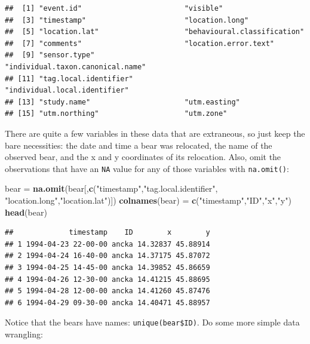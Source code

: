 \documentclass[]{book}
\newenvironment{Shaded}{\begin{snugshade}}{\end{snugshade}}
\newcommand{\KeywordTok}[1]{\textcolor[rgb]{0.13,0.29,0.53}{\textbf{#1}}}
\newcommand{\StringTok}[1]{\textcolor[rgb]{0.31,0.60,0.02}{#1}}
\newcommand{\CommentTok}[1]{\textcolor[rgb]{0.56,0.35,0.01}{\textit{#1}}}
\newcommand{\OperatorTok}[1]{\textcolor[rgb]{0.81,0.36,0.00}{\textbf{#1}}}
\newcommand{\NormalTok}[1]{#1}
\theoremstyle{definition}
\theoremstyle{definition}
\theoremstyle{definition}
\theoremstyle{remark}
\begin{document}
\begin{verbatim}
##  [1] "event.id"                        "visible"                        
##  [3] "timestamp"                       "location.long"                  
##  [5] "location.lat"                    "behavioural.classification"     
##  [7] "comments"                        "location.error.text"            
##  [9] "sensor.type"                     "individual.taxon.canonical.name"
## [11] "tag.local.identifier"            "individual.local.identifier"    
## [13] "study.name"                      "utm.easting"                    
## [15] "utm.northing"                    "utm.zone"
\end{verbatim}

There are quite a few variables in these data that are extraneous, so
just keep the bare necessities: the date and time a bear was relocated,
the name of the observed bear, and the x and y coordinates of its
relocation. Also, omit the observations that have an \texttt{NA} value
for any of those variables with \texttt{na.omit()}:

\begin{Shaded}
\begin{Highlighting}[]
\NormalTok{bear =}\StringTok{ }\KeywordTok{na.omit}\NormalTok{(bear[,}\KeywordTok{c}\NormalTok{(}\StringTok{"timestamp"}\NormalTok{,}\StringTok{"tag.local.identifier"}\NormalTok{,}
                        \StringTok{"location.long"}\NormalTok{,}\StringTok{"location.lat"}\NormalTok{)])}
\KeywordTok{colnames}\NormalTok{(bear) =}\StringTok{ }\KeywordTok{c}\NormalTok{(}\StringTok{"timestamp"}\NormalTok{,}\StringTok{"ID"}\NormalTok{,}\StringTok{"x"}\NormalTok{,}\StringTok{"y"}\NormalTok{)}
\KeywordTok{head}\NormalTok{(bear)}
\end{Highlighting}
\end{Shaded}

\begin{verbatim}
##             timestamp    ID        x        y
## 1 1994-04-23 22-00-00 ancka 14.32837 45.88914
## 2 1994-04-24 16-40-00 ancka 14.37175 45.87072
## 3 1994-04-25 14-45-00 ancka 14.39852 45.86659
## 4 1994-04-26 12-30-00 ancka 14.41215 45.88695
## 5 1994-04-28 12-00-00 ancka 14.41260 45.87476
## 6 1994-04-29 09-30-00 ancka 14.40471 45.88957
\end{verbatim}

Notice that the bears have names: \texttt{unique(bear\$ID)}. Do some
more simple data wrangling:

\begin{Shaded}
\end{Shaded}
\end{document}

